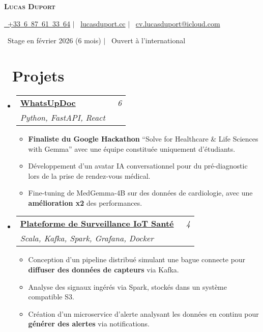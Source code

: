 \documentclass[letterpaper,11pt]{article}
\makeatletter
\newcommand{\resumeItem}[1]{
  \item\small{{#1 \vspace{-2pt}}}
}
\newcommand{\resumeSubheading}[4]{
  \vspace{-2pt}\item
  \begin{tabular*}{0.97\textwidth}[t]{@{}l@{\extracolsep{\fill}}r@{}}
    \textbf{#1} & \textit{\small #2} \\
    \textit{\small#3} & \textit{\small #4} \\
  \end{tabular*}\vspace{-7pt}
}
\newcommand{\resumeSubHeadingListStart}{\begin{itemize}[leftmargin=0.15in, label={}]}
\newcommand{\resumeSubHeadingListEnd}{\end{itemize}}
\newcommand{\resumeItemListStart}{\begin{itemize}}
\newcommand{\resumeItemListEnd}{\end{itemize}\vspace{-5pt}}
\makeatother
\begin{document}
\begin{center}
  \textbf{\Huge \scshape Lucas Duport}
\end{center}

\begin{center}
  \small \href{tel:+33687613364}{\faPhone\ +33~6~87~61~33~64} $|$
  \faLink\ \href{https://lucasduport.cc}{lucasduport.cc} $|$
  \faEnvelope\ \href{mailto:cv.lucasduport@icloud.com}
  {cv.lucasduport@icloud.com} 
\end{center}

\begin{center}
  \small \faCalendar\ Stage en février 2026 (6 mois) $|$
  \faGlobe\ Ouvert à l’international
\end{center}


\section*{\small \faProjectDiagram\ \large Projets}
\resumeSubHeadingListStart

    \resumeSubheading
    {\href{https://github.com/orgs/WhatsUpDoc-Google-Hackathon/repositories}{WhatsUpDoc}}{\small \faGroup\ \normalsize 6}
    {Python, FastAPI, React}{}
    {}
    \resumeItemListStart
      \resumeItem{\textbf{Finaliste du Google Hackathon} “Solve for Healthcare \& Life Sciences with Gemma” avec une équipe constituée uniquement d'étudiants.}
      \resumeItem{Développement d’un avatar IA conversationnel pour du pré-diagnostic lors de la prise de rendez-vous médical.}
      \resumeItem{Fine-tuning de MedGemma-4B sur des données de cardiologie, avec une \textbf{amélioration x2} des performances.}
    \resumeItemListEnd

    \resumeSubheading
    {\href{https://github.com/lucasduport/iot-ring-monitoring}{Plateforme de Surveillance IoT Santé}}{\small \faGroup\ \normalsize 4}
  {Scala, Kafka, Spark, Grafana, Docker}{}
  {}
  \resumeItemListStart
    \resumeItem{Conception d’un pipeline distribué simulant une bague connecte pour \textbf{diffuser des données de capteurs} via Kafka.}
    \resumeItem{Analyse des signaux ingérés via Spark, stockés dans un système compatible S3.}
    \resumeItem{Création d’un microservice d’alerte analysant les données en continu pour \textbf{générer des alertes} via notifications.}
  \resumeItemListEnd

\resumeSubHeadingListEnd

\end{document}
